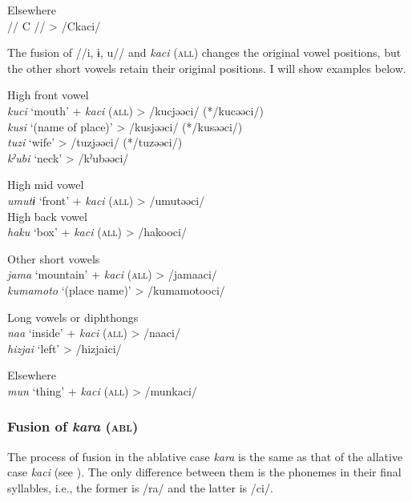 \ex  Elsewhere\\
    //  C  //        >  /Ckaci/
\z
\z

The fusion of //i, ɨ, u// and \textit{kaci} (\textsc{all}) changes the original vowel positions, but the other short vowels retain their original positions. I will show examples below.

\ea\label{ex:6-32}
 \ea High front vowel  \\
    \textit{kuci}  ‘mouth’  +  \textit{kaci} (\textsc{all})  >  /kucjəəci/  (*/kucəəci/)\\
    \textit{kusi}  ‘(name of place)’      >  /kusjəəci/  (*/kusəəci/)\\
    \textit{tuzi}  ‘wife’      >  /tuzjəəci/  (*/tuzəəci/)\\
    \textit{kˀubi}  ‘neck’      >  /kˀubəəci/  

\ex High mid vowel\\
    \textit{umutɨ}  ‘front’  +  \textit{kaci} (\textsc{all})  >  /umutəəci/\\

\ex High back vowel  \\
    \textit{haku}  ‘box’  +  \textit{kaci} (\textsc{all})  >  /hakooci/

\ex Other short vowels\\
    \textit{jama}  ‘mountain’  +  \textit{kaci} (\textsc{all})  >  /jamaaci/\\
    \textit{kumamoto}  ‘(place name)’      >  /kumamotooci/  

\ex Long vowels or diphthongs  \\
    \textit{naa}  ‘inside’  +  \textit{kaci} (\textsc{all})  >  /naaci/\\
    \textit{hizjai}  ‘left’      >  /hizjaici/  

\ex  Elsewhere\\
\textit{mun}  ‘thing’  +  \textit{kaci} (\textsc{all})  >  /munkaci/\\
\z
\z

\subsubsection{Fusion of \textit{kara} (\textsc{abl})}
\label{bkm:Ref365151812}
The process of fusion in the ablative case \textit{kara} is the same as that of the allative case \textit{kaci} (see ). The only difference between them is the phonemes in their final syllables, i.e., the former is /ra/ and the latter is /ci/.

